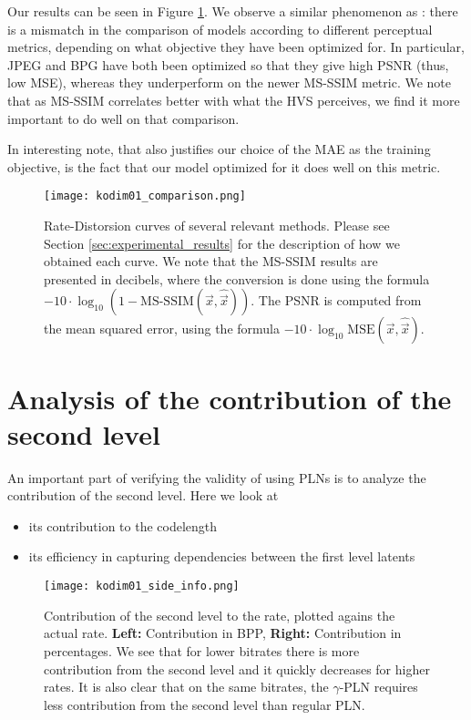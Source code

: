 Our results can be seen in Figure \ref{fig:kodim01_comp}. We observe a similar
phenomenon as \cite{balle2018variational}: there is a mismatch in the comparison
of models according to different perceptual metrics, depending on what objective
they have been optimized for. In particular, JPEG and BPG have both been
optimized so that they give high PSNR (thus, low MSE), whereas they underperform
on the newer MS-SSIM metric. We note that as MS-SSIM correlates better with what
the HVS perceives, we find it more important to do well on that comparison.
\par
In interesting note, that also justifies our choice of the MAE as the training
objective, is the fact that our model optimized for it does well on this metric.

\begin{figure}
  \centering
  \texttt{[image: kodim01\_comparison.png]}
  \caption{Rate-Distorsion curves of several relevant methods. Please see
    Section \ref{sec:experimental_results} for the description of how we
    obtained each curve. We note that the MS-SSIM results are presented in
    decibels, where the conversion is done using the formula $-10 \cdot
    \log_{10}\left( 1 - \text{MS-SSIM}(\vec{x}, \hat{\vec{x}}) \right)$.
    The PSNR is computed from the mean squared error, using the formula 
    $-10 \cdot \log_{10}\text{MSE}(\vec{x}, \hat{\vec{x}})$.}
  \label{fig:kodim01_comp}
\end{figure}

\section{Analysis of the contribution of the second level}
\par
An important part of verifying the validity of using PLNs is to analyze the
contribution of the second level. Here we look at
\begin{itemize}
\item its contribution to the codelength
\item its efficiency in capturing dependencies between the first level latents
\end{itemize}

\begin{figure}
  \centering
  \texttt{[image: kodim01\_side\_info.png]}
  \caption{Contribution of the second level to the rate, plotted agains the
    actual rate. \textbf{Left:} Contribution in BPP, \textbf{Right:}
    Contribution in percentages. We see that for lower bitrates there is more
    contribution from the second level and it quickly decreases for higher
    rates. It is also clear that on the same bitrates, the $\gamma$-PLN requires
    less contribution from the second level than regular PLN.}
  \label{fig:kodim01_side_info}
\end{figure}

